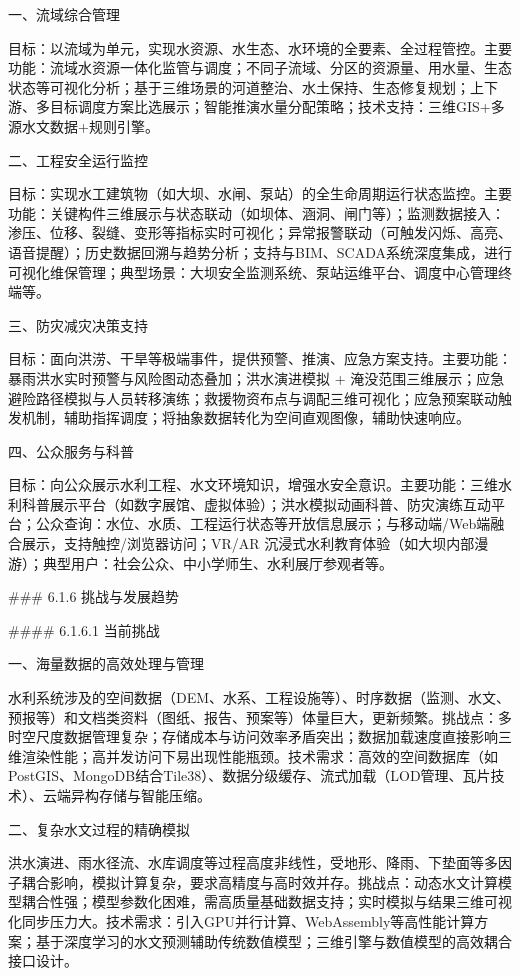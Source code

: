 一、流域综合管理

目标：以流域为单元，实现水资源、水生态、水环境的全要素、全过程管控。主要功能：流域水资源一体化监管与调度；不同子流域、分区的资源量、用水量、生态状态等可视化分析；基于三维场景的河道整治、水土保持、生态修复规划；上下游、多目标调度方案比选展示；智能推演水量分配策略；技术支持：三维GIS+多源水文数据+规则引擎。

二、工程安全运行监控

目标：实现水工建筑物（如大坝、水闸、泵站）的全生命周期运行状态监控。主要功能：关键构件三维展示与状态联动（如坝体、涵洞、闸门等）；监测数据接入：渗压、位移、裂缝、变形等指标实时可视化；异常报警联动（可触发闪烁、高亮、语音提醒）；历史数据回溯与趋势分析；支持与BIM、SCADA系统深度集成，进行可视化维保管理；典型场景：大坝安全监测系统、泵站运维平台、调度中心管理终端等。

三、防灾减灾决策支持

目标：面向洪涝、干旱等极端事件，提供预警、推演、应急方案支持。主要功能：暴雨洪水实时预警与风险图动态叠加；洪水演进模拟 + 淹没范围三维展示；应急避险路径模拟与人员转移演练；救援物资布点与调配三维可视化；应急预案联动触发机制，辅助指挥调度；将抽象数据转化为空间直观图像，辅助快速响应。

四、公众服务与科普

目标：向公众展示水利工程、水文环境知识，增强水安全意识。主要功能：三维水利科普展示平台（如数字展馆、虚拟体验）；洪水模拟动画科普、防灾演练互动平台；公众查询：水位、水质、工程运行状态等开放信息展示；与移动端/Web端融合展示，支持触控/浏览器访问；VR/AR 沉浸式水利教育体验（如大坝内部漫游）；典型用户：社会公众、中小学师生、水利展厅参观者等。

\#\#\# 6.1.6 挑战与发展趋势

\#\#\#\# 6.1.6.1 当前挑战

一、海量数据的高效处理与管理

水利系统涉及的空间数据（DEM、水系、工程设施等）、时序数据（监测、水文、预报等）和文档类资料（图纸、报告、预案等）体量巨大，更新频繁。挑战点：多时空尺度数据管理复杂；存储成本与访问效率矛盾突出；数据加载速度直接影响三维渲染性能；高并发访问下易出现性能瓶颈。技术需求：高效的空间数据库（如PostGIS、MongoDB结合Tile38）、数据分级缓存、流式加载（LOD管理、瓦片技术）、云端异构存储与智能压缩。

二、复杂水文过程的精确模拟

洪水演进、雨水径流、水库调度等过程高度非线性，受地形、降雨、下垫面等多因子耦合影响，模拟计算复杂，要求高精度与高时效并存。挑战点：动态水文计算模型耦合性强；模型参数化困难，需高质量基础数据支持；实时模拟与结果三维可视化同步压力大。技术需求：引入GPU并行计算、WebAssembly等高性能计算方案；基于深度学习的水文预测辅助传统数值模型；三维引擎与数值模型的高效耦合接口设计。

